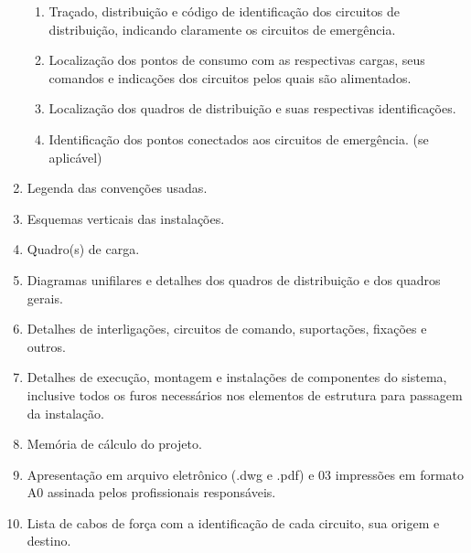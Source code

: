 \begin{enumerate}
\begin{enumerate}
			\item Traçado, distribuição e código de identificação dos circuitos de distribuição, indicando claramente os circuitos de emergência.

			\item Localização dos pontos de consumo com as respectivas cargas, seus comandos e indicações dos circuitos pelos quais são alimentados.

			\item Localização dos quadros de distribuição e suas respectivas identificações.

			\item Identificação dos pontos conectados aos circuitos de emergência. (se aplicável)
		\end{enumerate}

		\item Legenda das convenções usadas.

		\item Esquemas verticais das instalações.

		\item Quadro(s) de carga.

		\item Diagramas unifilares e detalhes dos quadros de distribuição e dos quadros gerais.

		\item Detalhes de interligações, circuitos de comando, suportações, fixações e outros.

		\item Detalhes de execução, montagem e instalações de componentes do sistema, inclusive todos os furos necessários nos elementos de estrutura para passagem da instalação.

		\item Memória de cálculo do projeto.

		\item Apresentação em arquivo eletrônico (.dwg e .pdf) e 03 impressões em formato A0 assinada pelos profissionais responsáveis.

		\item Lista de cabos de força com a identificação de cada circuito, sua origem e destino.
	\end{enumerate}


